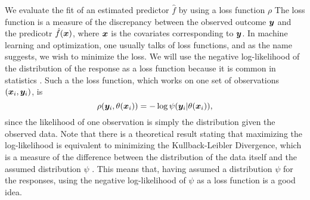 We evaluate the fit of an estimated predictor $\hat{f}$ by using a loss function $\rho$
The loss function is a measure of the discrepancy between the observed outcome $\bm{y}$ and the predicotr $\hat{f}(\bm{x})$, where $\bm{x}$ is the covariates corresponding to $\bm{y}$.
In machine learning and optimization, one usually talks of loss functions, and as the name suggests, we wish to minimize the loss.
We will use the negative log-likelihood of the distribution of the response as a loss function because it is common in statistics \citep{mayr14a}.
Such a the loss function, which works on one set of observations $(\bm{x}_i,\bm{y}_i)$, is
\begin{equation*}
    \rho(\bm{y}_i,\theta(\bm{x}_i))=-\log{\psi(\bm{y}_i|\theta(\bm{x}_i))},
\end{equation*}
since the likelihood of one observation is simply the distribution given the observed data.
Note that there is a theoretical result stating that maximizing the log-likelihood is equivalent to minimizing the Kullback-Leibler Divergence, which is a measure of the difference between the distribution of the data itself and the assumed distribution $\psi$ \citep{Akaike1998}.
This means that, having assumed a distribution $\psi$ for the responses, using the negative log-likelihood of $\psi$ as a loss function is a good idea.

